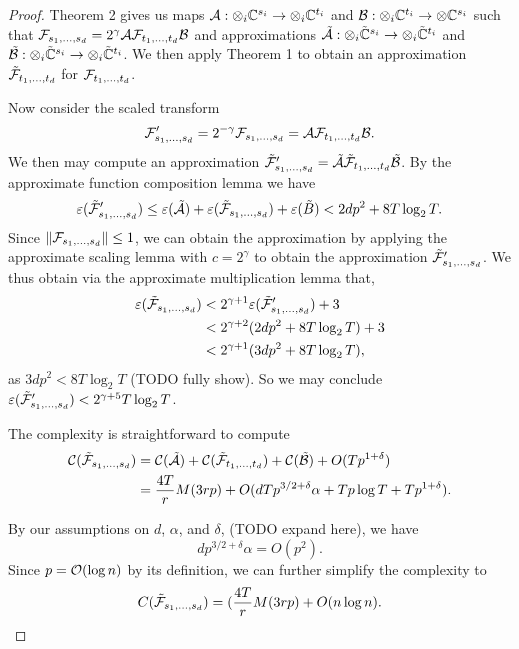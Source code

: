 \begin{proof}
    Theorem 2 gives us maps $\mathcal A: \otimes_i {\mathbb C}^{s_i} \to \otimes_i {\mathbb C}^{t_i}$ and $\mathcal B: \otimes_i {\mathbb C}^{t_i} \to \otimes {\mathbb C}^{s_i}$ such that $\mathcal F_{s_1, \ldots, s_d} = 2^\gamma \mathcal A\mathcal F_{t_1, \ldots, t_d} \mathcal B$ and approximations $\tilde{\mathcal A}: \otimes_i \tilde{{\mathbb C}}^{s_i} \to \otimes_i \tilde{{\mathbb C}}^{t_i}$ and $\tilde{\mathcal B}: \otimes_i \tilde{{\mathbb C}}^{s_i} \to \otimes_i \tilde{{\mathbb C}}^{t_i}$. We then apply Theorem 1 to obtain an approximation $\tilde{\mathcal F}_{t_1, \ldots, t_d}$ for $\mathcal F_{t_1, \ldots, t_d}$.

    Now consider the scaled transform
    \[
        \mathcal F^\prime_{s_1, \ldots, s_d} = 2^{-\gamma} \mathcal F_{s_1, \ldots, s_d} = \mathcal A\mathcal F_{t_1, \ldots, t_d}\mathcal B.
    \]
    We then may compute an approximation $\tilde{\mathcal F}^\prime_{s_1, \ldots, s_d} = \tilde{\mathcal A}\tilde{\mathcal F}_{t_1, \ldots, t_d}\tilde{\mathcal B}$. By the approximate function composition lemma we have
    \[
        \varepsilon(\tilde{\mathcal F}^\prime_{s_1, \ldots, s_d}) \le \varepsilon(\tilde{\mathcal A}) + \varepsilon(\tilde{\mathcal F}_{s_1, \ldots, s_d}) + \varepsilon(\tilde{B}) < 2dp^2 + 8T\log_2 T.
    \]
    Since $\|\mathcal F_{s_1, \ldots, s_d}\| \le 1$, we can obtain the approximation by applying the approximate scaling lemma with $c =  2^\gamma$ to obtain the approximation $\tilde{\mathcal F}_{s_1, \ldots, s_d}^\prime$. We thus obtain via the approximate multiplication lemma that,
    \begin{align*}
        \varepsilon(\tilde{\mathcal F}_{s_1, \ldots, s_d}) &< 2^{\gamma + 1} \varepsilon(\tilde{\mathcal F}_{s_1, \ldots, s_d}^\prime) + 3\\
                                                      &< 2^{\gamma + 2}(2dp^2 + 8T \log_2 T) + 3\\
                                                      &< 2^{\gamma + 1}(3dp^2 + 8T\log_2 T),
    \end{align*}
    as $3dp^2 < 8T \log_2 T$ (TODO fully show).
    So we may conclude $\varepsilon(\tilde{\mathcal F}_{s_1, \ldots, s_d}^\prime) < 2^{\gamma + 5}T\log_2 T$.

    The complexity is straightforward to compute
    \begin{align*}
        \mathcal C(\tilde{\mathcal F}_{s_1, \ldots, s_d}) &= \mathcal C(\tilde{\mathcal A}) + \mathcal C(\tilde{\mathcal F}_{t_1, \ldots, t_d}) + \mathcal C(\tilde{\mathcal B}) + O(Tp^{1 + \delta})\\
                                                &= \frac{4T}{r}M(3rp) + O(dTp^{3/2 + \delta}\alpha + Tp\log T + Tp^{1 + \delta}).
    \end{align*}

    By our assumptions on $d$, $\alpha$, and $\delta$, (TODO expand here), we have
    \[
        dp^{3/2 + \delta}\alpha = O(p^2).
    \]
    Since $p = \mathcal O(\log n)$ by its definition, we can further simplify the complexity to
    \[
        C(\tilde{\mathcal F}_{s_1, \ldots, s_d}) = (\frac{4T}{r}M(3rp) + O(n \log n).
    \]
\end{proof}

